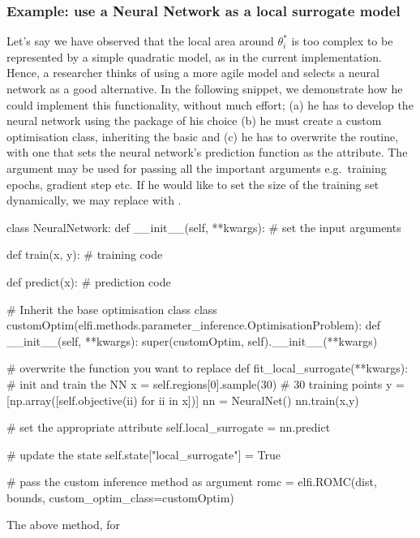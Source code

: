 \subsubsection*{Example: use a Neural Network as a local surrogate model}

Let's say we have observed that the local area around $\theta_i^*$ is
too complex to be represented by a simple quadratic model, as in the
current implementation. Hence, a researcher thinks of using a more
agile model and selects a neural network as a good alternative. In the
following snippet, we demonstrate how he could implement this
functionality, without much effort; (a) he has to develop the neural
network using the package of his choice (b) he must create a custom
optimisation class, inheriting the basic 
and (c) he has to overwrite the  routine,
with one that sets the neural network's prediction function as the
 attribute. The argument 
may be used for passing all the important arguments e.g.\ training
epochs, gradient step etc. If he would like to set the size of the
training set dynamically, we may replace  with .

\begin{pythoncode}
  class NeuralNetwork:
      def __init__(self, **kwargs):
          # set the input arguments

      def train(x, y):
          # training code

      def predict(x):
          # prediction code

  # Inherit the base optimisation class
  class customOptim(elfi.methods.parameter_inference.OptimisationProblem):
      def __init__(self, **kwargs):
          super(customOptim, self).__init__(**kwargs)

      # overwrite the function you want to replace
      def fit_local_surrogate(**kwargs):
          # init and train the NN
          x = self.regions[0].sample(30) # 30 training points
          y = [np.array([self.objective(ii) for ii in x])]
          nn = NeuralNet()
          nn.train(x,y)

          # set the appropriate attribute
          self.local_surrogate = nn.predict

          # update the state
          self.state["local_surrogate"] = True

  # pass the custom inference method as argument
  romc = elfi.ROMC(dist, bounds, custom_optim_class=customOptim)
\end{pythoncode}


The above method, for 
